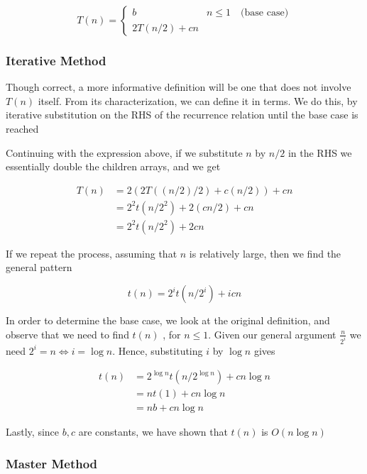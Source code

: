$$ T(n) = \left\{ 
	\begin{array}{ll}
		b & n \leq 1 \quad \text{(base case)} \\
		2T(n/2) + cn 
	\end{array}
\right.
$$
\subsubsection{Iterative Method}
\par{Though correct, a more informative definition will be one that does not
involve $T(n)$ itself. From its  characterization, we can
define it in  terms. We do this, by iterative substitution on the
RHS of the recurrence relation until the base case is reached}
\par{Continuing with the expression above, if we substitute $n$ by $n/2$ in the RHS we
essentially double the children arrays, and we get}

\begin{align*}
	T(n) &= 2(2T((n/2)/2) + c(n/2)) + cn \\
		&= 2^2t(n/2^2) + 2(cn/2) + cn \\
		&= 2^2t(n/2^2) + 2cn
\end{align*}

\par{If we repeat the process, assuming that $n$ is relatively large, then we
find the general pattern}

$$t(n) = 2^it(n/2^i) +  icn$$

\par{In order to determine the base case, we look at the original definition,
and observe that  we need to find $t(n)$ , for $n \leq 1$. Given our general
argument $\frac{n}{2^i}$ we need $2^i = n \iff i = \log n$. Hence, substituting
$i$ by $ \log n$ gives}

\begin{align*}
	t(n) &= 2^{\log n} t(n/2^{\log n}) + cn\log n \\
		&= nt(1) + cn\log n \\
		&= nb + cn\log n
\end{align*}

\par{Lastly, since $b,c$ are constants, we have shown that $t(n)$ is $O(n\log
n)$}

\subsubsection{Master Method}

